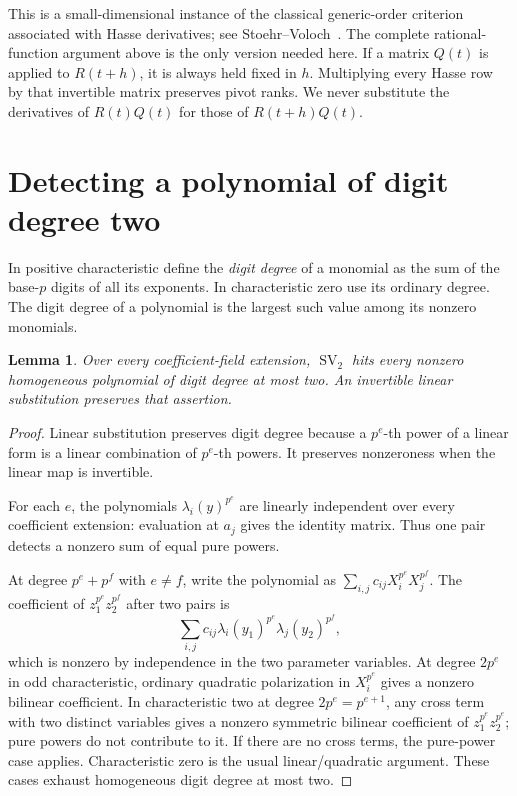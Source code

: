 \documentclass[11pt]{article}
\newtheorem{lemma}[theorem]{Lemma}
\newcommand{\SV}{\operatorname{SV}}
\begin{document}
This is a small-dimensional instance of the classical generic-order
criterion associated with Hasse derivatives; see
Stoehr--Voloch~\cite{SVorder}. The complete rational-function argument
above is the only version needed here. If a matrix \(Q(t)\) is applied
to \(R(t+h)\), it is always held fixed in \(h\). Multiplying every
Hasse row by that invertible matrix preserves pivot ranks. We never
substitute the derivatives of \(R(t)Q(t)\) for those of \(R(t+h)Q(t)\).

\section{Detecting a polynomial of digit degree two}

In positive characteristic define the \emph{digit degree} of a monomial
as the sum of the base-\(p\) digits of all its exponents. In
characteristic zero use its ordinary degree. The digit degree of a
polynomial is the largest such value among its nonzero monomials.

\begin{lemma}\label{lem:digit}
Over every coefficient-field extension, \(\SV_2\) hits every nonzero
homogeneous polynomial of digit degree at most two. An invertible
linear substitution preserves that assertion.
\end{lemma}

\begin{proof}
Linear substitution preserves digit degree because a \(p^e\)-th power
of a linear form is a linear combination of \(p^e\)-th powers. It
preserves nonzeroness when the linear map is invertible.

For each \(e\), the polynomials \(\lambda_i(y)^{p^e}\) are linearly
independent over every coefficient extension: evaluation at \(a_j\)
gives the identity matrix. Thus one pair detects a nonzero sum of
equal pure powers.

At degree \(p^e+p^f\) with \(e\ne f\), write the polynomial as
\(\sum_{i,j}c_{ij}X_i^{p^e}X_j^{p^f}\). The coefficient of
\(z_1^{p^e}z_2^{p^f}\) after two pairs is
\[
 \sum_{i,j}c_{ij}\lambda_i(y_1)^{p^e}\lambda_j(y_2)^{p^f},
\]
which is nonzero by independence in the two parameter variables.
At degree \(2p^e\) in odd characteristic, ordinary quadratic
polarization in \(X_i^{p^e}\) gives a nonzero bilinear coefficient.
In characteristic two at degree \(2p^e=p^{e+1}\), any cross term
with two distinct variables gives a nonzero symmetric bilinear
coefficient of \(z_1^{p^e}z_2^{p^e}\); pure powers do not contribute to
it. If there are no cross terms, the pure-power case applies.
Characteristic zero is the usual linear/quadratic argument. These
cases exhaust homogeneous digit degree at most two.
\end{proof}
\end{document}
